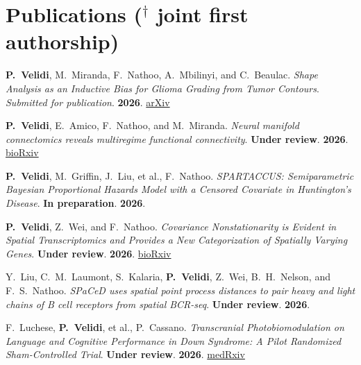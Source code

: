 \documentclass[9pt]{extarticle}
\begin{document}
\section{Publications \textnormal{\small ($^\dagger$ joint first authorship)}}
{\small
\textbf{P.\ Velidi}, M.\ Miranda, F.\ Nathoo, A.\ Mbilinyi, and C.\ Beaulac.
\textit{Shape Analysis as an Inductive Bias for Glioma Grading from Tumor Contours}.
\textit{Submitted for publication}. \textbf{2026}.
\href{https://arxiv.org/abs/2607.26090}{arXiv}\par\vspace{1pt}

\textbf{P.\ Velidi}, E.\ Amico, F.\ Nathoo, and M.\ Miranda.
\textit{Neural manifold connectomics reveals multiregime functional connectivity}.
\textbf{Under review}. \textbf{2026}. \href{https://www.biorxiv.org/content/10.64898/2026.07.24.740595v1}{bioRxiv}\par\vspace{1pt}

\textbf{P.\ Velidi}, M.\ Griffin, J.\ Liu, et al., F.\ Nathoo.
\textit{SPARTACCUS: Semiparametric Bayesian Proportional Hazards Model with a Censored Covariate in Huntington's Disease}.
\textbf{In preparation}. \textbf{2026}.\par\vspace{1pt}

\textbf{P.\ Velidi}, Z.\ Wei, and F.\ Nathoo.
\textit{Covariance Nonstationarity is Evident in Spatial Transcriptomics and Provides a New Categorization of Spatially Varying Genes}.
\textbf{Under review}. \textbf{2026}. \href{https://www.biorxiv.org/content/10.64898/2026.08.10.743911v1}{bioRxiv}\par\vspace{1pt}

Y.\ Liu, C.\ M.\ Laumont, S.\ Kalaria, \textbf{P.\ Velidi}, Z.\ Wei, B.\ H.\ Nelson, and F.\ S.\ Nathoo.
\textit{SPaCeD uses spatial point process distances to pair heavy and light chains of B cell receptors from spatial BCR-seq}.
\textbf{Under review}. \textbf{2026}.\par\vspace{1pt}

F.\ Luchese, \textbf{P.\ Velidi}, et al., P.\ Cassano.
\textit{Transcranial Photobiomodulation on Language and Cognitive Performance in Down Syndrome: A Pilot Randomized Sham-Controlled Trial}.
\textbf{Under review}. \textbf{2026}. \href{https://www.medrxiv.org/content/10.64898/2026.07.03.26357051v1}{medRxiv}\par\vspace{1pt}

}
\end{document}
